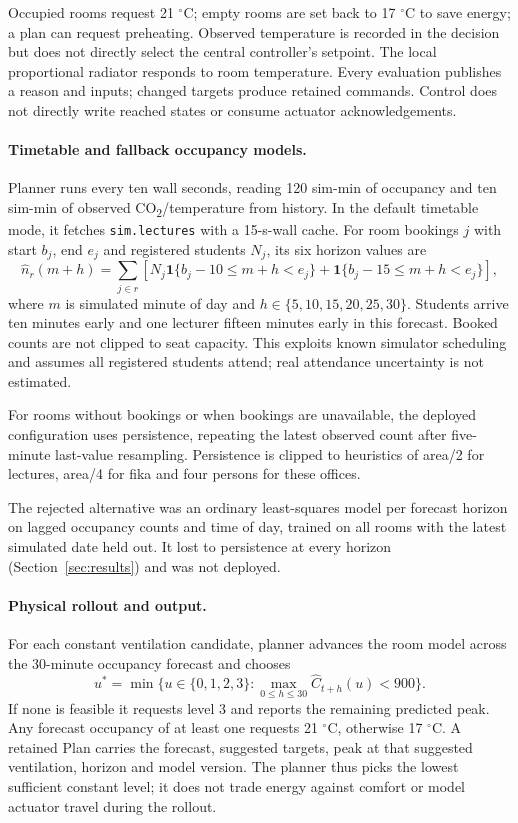 \documentclass[11pt,a4paper]{article}
\begin{document}
Occupied rooms request 21 $^\circ$C; empty rooms are set back to 17 $^\circ$C to save energy; a plan can request preheating. Observed temperature is recorded in the decision but does not directly select the central controller's setpoint. The local proportional radiator responds to room temperature. Every evaluation publishes a reason and inputs; changed targets produce retained commands. Control does not directly write reached states or consume actuator acknowledgements.

\paragraph{Timetable and fallback occupancy models.}
Planner runs every ten wall seconds, reading 120 sim-min of occupancy and ten sim-min of observed CO\textsubscript{2}/temperature from history. In the default timetable mode, it fetches \texttt{sim.lectures} with a 15-s-wall cache. For room bookings $j$ with start $b_j$, end $e_j$ and registered students $N_j$, its six horizon values are
\begin{equation}
\widehat n_r(m+h)=\sum_{j\in r}\left[
N_j\mathbf1\{b_j-10\leq m+h<e_j\}
+\mathbf1\{b_j-15\leq m+h<e_j\}\right],
\end{equation}
where $m$ is simulated minute of day and $h\in\{5,10,15,20,25,30\}$. Students arrive ten minutes early and one lecturer fifteen minutes early in this forecast. Booked counts are not clipped to seat capacity. This exploits known simulator scheduling and assumes all registered students attend; real attendance uncertainty is not estimated.

For rooms without bookings or when bookings are unavailable, the deployed configuration uses persistence, repeating the latest observed count after five-minute last-value resampling. Persistence is clipped to heuristics of area/2 for lectures, area/4 for fika and four persons for these offices.

The rejected alternative was an ordinary least-squares model per forecast horizon on lagged occupancy counts and time of day, trained on all rooms with the latest simulated date held out. It lost to persistence at every horizon (Section~\ref{sec:results}) and was not deployed.

\paragraph{Physical rollout and output.}
For each constant ventilation candidate, planner advances the room model across the 30-minute occupancy forecast and chooses
\begin{equation}
u^*=\min\{u\in\{0,1,2,3\}:\max_{0\leq h\leq30}\widehat C_{t+h}(u)<900\}.
\end{equation}
If none is feasible it requests level 3 and reports the remaining predicted peak. Any forecast occupancy of at least one requests 21 $^\circ$C, otherwise 17 $^\circ$C. A retained Plan carries the forecast, suggested targets, peak at that suggested ventilation, horizon and model version. The planner thus picks the lowest sufficient constant level; it does not trade energy against comfort or model actuator travel during the rollout.
\end{document}
